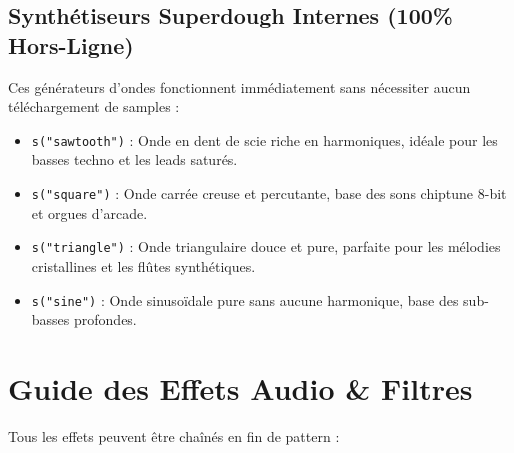 \documentclass[a4paper,10pt]{article}
\begin{document}
\subsection{Synthétiseurs Superdough Internes (100\% Hors-Ligne)}
Ces générateurs d'ondes fonctionnent immédiatement sans nécessiter aucun téléchargement de samples :
\begin{itemize}
    \item \texttt{s("sawtooth")} : Onde en dent de scie riche en harmoniques, idéale pour les basses techno et les leads saturés.
    \item \texttt{s("square")} : Onde carrée creuse et percutante, base des sons chiptune 8-bit et orgues d'arcade.
    \item \texttt{s("triangle")} : Onde triangulaire douce et pure, parfaite pour les mélodies cristallines et les flûtes synthétiques.
    \item \texttt{s("sine")} : Onde sinusoïdale pure sans aucune harmonique, base des sub-basses profondes.
\end{itemize}

\section{Guide des Effets Audio \& Filtres}
Tous les effets peuvent être chaînés en fin de pattern :
\end{document}
